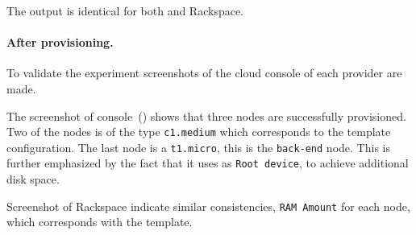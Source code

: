 The output is identical for both  and Rackspace.

\paragraph{After provisioning.}



To validate the experiment screenshots of the cloud console of each provider are made.

The screenshot of  console~() shows that three nodes
are successfully provisioned.
Two of the nodes is of the type \texttt{c1.medium} which corresponds to the template configuration.
The last node is a \texttt{t1.micro}, \ie this is the \texttt{back-end} node.
This is further emphasized by the fact that it uses  as \texttt{Root device},
to achieve additional disk space.

Screenshot of Rackspace indicate similar consistencies,
\eg \texttt{RAM Amount} for each node, which corresponds with the template.
